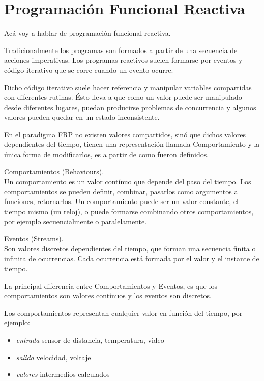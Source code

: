 



\section{Programación Funcional Reactiva}

Acá voy a hablar de programación funcional reactiva.

Tradicionalmente los programas son formados a partir de
una secuencia de acciones imperativas. Los programas
reactivos suelen formarse por eventos y código iterativo
que se corre cuando un evento ocurre.

Dicho código iterativo suele hacer referencia y manipular
variables compartidas con diferentes rutinas. Ésto lleva a que
como un valor puede ser manipulado desde diferentes lugares,
puedan producirse problemas de concurrencia y algunos valores
pueden quedar en un estado inconsistente.

En el paradigma FRP no existen valores compartidos, sinó que
dichos valores dependientes del tiempo, tienen una representación
llamada Comportamiento y la única forma de modificarlos, es
a partir de como fueron definidos.

 

\begin{definicion}
Comportamientos (Behaviours).\\
Un comportamiento es un valor contínuo que depende del paso del tiempo.
Los comportamientos se pueden definir, combinar, pasarlos como
argumentos a funciones, retornarlos.
Un comportamiento puede ser un valor constante, el tiempo mismo (un reloj),
o puede formarse combinando otros comportamientos, por ejemplo secuencialmente
o paralelamente.
\end{definicion}

\begin{definicion}
Eventos (Streams).\\
Son valores discretos dependientes del tiempo, que forman
una secuencia finita o infinita de ocurrencias. Cada ocurrencia
está formada por el valor y el instante de tiempo.
\end{definicion}

La principal diferencia entre Comportamientos y Eventos, es que los
comportamientos son valores contínuos y los eventos son discretos.

Los comportamientos representan cualquier valor en función del tiempo,
por ejemplo:
\begin{itemize}
\item \textit{entrada} sensor de distancia, temperatura, video
\item \textit{salida} velocidad, voltaje
\item \textit{valores} intermedios calculados
\end{itemize}

